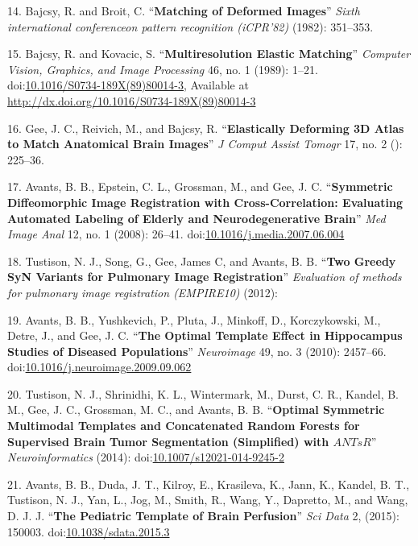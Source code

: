 \documentclass[11pt,]{article}
\begin{document}
\hypertarget{ref-Bajcsy:1982aa}{}
14. Bajcsy, R. and Broit, C. ``\textbf{Matching of Deformed Images}''
\emph{Sixth international conferenceon pattern recognition (iCPR'82)}
(1982): 351--353.

\hypertarget{ref-Bajcsy:1989aa}{}
15. Bajcsy, R. and Kovacic, S. ``\textbf{Multiresolution Elastic
Matching}'' \emph{Computer Vision, Graphics, and Image Processing} 46,
no. 1 (1989): 1--21.
doi:\href{https://doi.org/10.1016/S0734-189X(89)80014-3}{10.1016/S0734-189X(89)80014-3},
Available at \url{http://dx.doi.org/10.1016/S0734-189X(89)80014-3}

\hypertarget{ref-Gee:1993aa}{}
16. Gee, J. C., Reivich, M., and Bajcsy, R. ``\textbf{Elastically
Deforming 3D Atlas to Match Anatomical Brain Images}'' \emph{J Comput
Assist Tomogr} 17, no. 2 (): 225--36.

\hypertarget{ref-Avants:2008aa}{}
17. Avants, B. B., Epstein, C. L., Grossman, M., and Gee, J. C.
``\textbf{Symmetric Diffeomorphic Image Registration with
Cross-Correlation: Evaluating Automated Labeling of Elderly and
Neurodegenerative Brain}'' \emph{Med Image Anal} 12, no. 1 (2008):
26--41.
doi:\href{https://doi.org/10.1016/j.media.2007.06.004}{10.1016/j.media.2007.06.004}

\hypertarget{ref-Tustison:2012aa}{}
18. Tustison, N. J., Song, G., Gee, James C, and Avants, B. B.
``\textbf{Two Greedy SyN Variants for Pulmonary Image Registration}''
\emph{Evaluation of methods for pulmonary image registration (EMPIRE10)}
(2012):

\hypertarget{ref-Avants:2010aa}{}
19. Avants, B. B., Yushkevich, P., Pluta, J., Minkoff, D., Korczykowski,
M., Detre, J., and Gee, J. C. ``\textbf{The Optimal Template Effect in
Hippocampus Studies of Diseased Populations}'' \emph{Neuroimage} 49, no.
3 (2010): 2457--66.
doi:\href{https://doi.org/10.1016/j.neuroimage.2009.09.062}{10.1016/j.neuroimage.2009.09.062}

\hypertarget{ref-Tustison:2014aa}{}
20. Tustison, N. J., Shrinidhi, K. L., Wintermark, M., Durst, C. R.,
Kandel, B. M., Gee, J. C., Grossman, M. C., and Avants, B. B.
``\textbf{Optimal Symmetric Multimodal Templates and Concatenated Random
Forests for Supervised Brain Tumor Segmentation (Simplified) with
\(ANTsR\)}'' \emph{Neuroinformatics} (2014):
doi:\href{https://doi.org/10.1007/s12021-014-9245-2}{10.1007/s12021-014-9245-2}

\hypertarget{ref-Avants:2015aa}{}
21. Avants, B. B., Duda, J. T., Kilroy, E., Krasileva, K., Jann, K.,
Kandel, B. T., Tustison, N. J., Yan, L., Jog, M., Smith, R., Wang, Y.,
Dapretto, M., and Wang, D. J. J. ``\textbf{The Pediatric Template of
Brain Perfusion}'' \emph{Sci Data} 2, (2015): 150003.
doi:\href{https://doi.org/10.1038/sdata.2015.3}{10.1038/sdata.2015.3}
\end{document}
